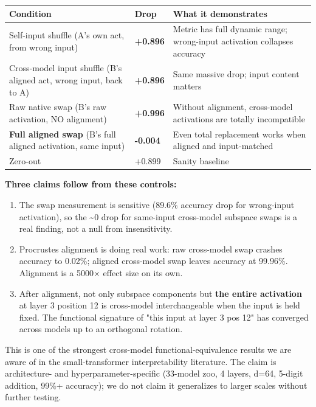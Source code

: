 \begin{center}
\begin{tabular}{|l|l|l|}
\hline
\textbf{Condition} & \textbf{Drop} & \textbf{What it demonstrates} \\
\hline
Self-input shuffle (A's own act, from wrong input) & \textbf{+0.896} & Metric has full dynamic range; wrong-input activation collapses accuracy \\
Cross-model input shuffle (B's aligned act, wrong input, back to A) & \textbf{+0.896} & Same massive drop; input content matters \\
Raw native swap (B's raw activation, NO alignment) & \textbf{+0.996} & Without alignment, cross-model activations are totally incompatible \\
\textbf{Full aligned swap} (B's full aligned activation, same input) & \textbf{-0.004} & Even total replacement works when aligned and input-matched \\
Zero-out & +0.899 & Sanity baseline \\
\hline
\end{tabular}
\end{center}


\textbf{Three claims follow from these controls:}

\begin{enumerate}
  \item The swap measurement is sensitive (89.6\% accuracy drop for wrong-input activation), so the \textasciitilde{}0 drop for same-input cross-model subspace swaps is a real finding, not a null from insensitivity.
  \item Procrustes alignment is doing real work: raw cross-model swap crashes accuracy to 0.02\%; aligned cross-model swap leaves accuracy at 99.96\%. Alignment is a 5000$\times$ effect size on its own.
  \item After alignment, not only subspace components but \textbf{the entire activation} at layer 3 position 12 is cross-model interchangeable when the input is held fixed. The functional signature of "this input at layer 3 pos 12" has converged across models up to an orthogonal rotation.
\end{enumerate}

This is one of the strongest cross-model functional-equivalence results
we are aware of in the small-transformer interpretability literature.
The claim is architecture- and hyperparameter-specific (33-model zoo,
4 layers, d=64, 5-digit addition, 99\%+ accuracy); we do not claim it
generalizes to larger scales without further testing.

